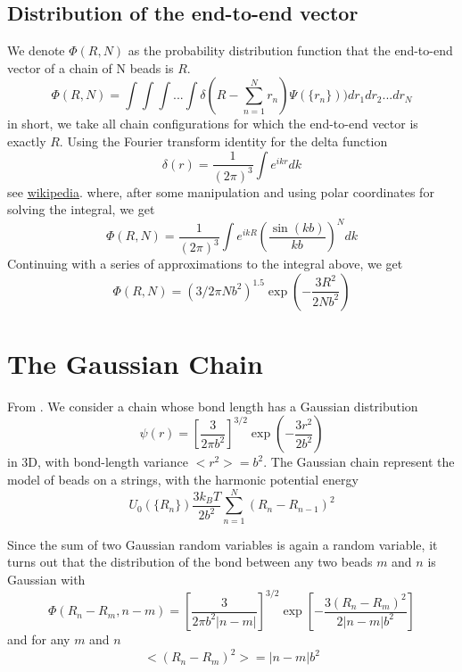 \documentclass{paper}
\begin{document}
\subsection{Distribution of the end-to-end vector}\label{subsection_distributionOfTheEndToEndVector}
We denote $\Phi(R,N)$ as the probability distribution function that the end-to-end vector of a chain of N beads is $R$.
\begin{equation*}
\Phi(R,N) =\int\int\int...\int\delta(R-\sum_{n=1}^Nr_n)\Psi(\{r_n\}))dr_1dr_2...dr_N
\end{equation*}
in short, we take all chain configurations for which the end-to-end vector is exactly $R$. Using the Fourier transform identity for the delta function
\begin{equation*}
\delta(r)= \frac{1}{(2\pi)^3}\int e^{ikr} dk
\end{equation*}
see \href{http://en.wikipedia.org/wiki/Dirac_delta_function}{wikipedia}.
where, after some manipulation and using polar coordinates for solving the integral, we get
\begin{equation*}
\Phi(R,N)=\frac{1}{(2\pi)^3}\int e^{ikR} \left(\frac{\sin(kb)}{kb}\right)^N dk
\end{equation*}
Continuing with a series of approximations to the integral above, we get
\begin{equation*}
\Phi(R,N)=(3/2\pi N b^2)^{1.5} \exp(-\frac{3R^2}{2Nb^2})
\end{equation*}


\section{The Gaussian Chain}\label{section_theGaussianChain}
From \cite{doi1986theory}. We consider a chain whose bond length has a Gaussian distribution 
\begin{equation*}
\psi(r)=\left[\frac{3}{2\pi b^2} \right]^{3/2} \exp \left( -\frac{3r^2}{2b^2} \right)
\end{equation*}
in 3D,  with bond-length variance $<r^2> =b^2$. The Gaussian chain represent the model of beads on a strings, with the harmonic potential energy 
\begin{equation*}
U_0(\{R_n\})\frac{3k_BT}{2b^2}\sum_{n=1}^N (R_n-R_{n-1})^2
\end{equation*}

Since the sum of two Gaussian random variables is again a random variable, it turns out that the distribution of the bond between any two beads $m$ and $n$ is Gaussian with 
\begin{equation*}
\Phi(R_n-R_m,n-m)=\left[\frac{3}{2\pi b^2 |n-m|}\right]^{3/2}\exp \left[-\frac{3(R_n-R_m)^2}{2|n-m|b^2}\right]
\end{equation*}
and for any $m$ and $n$ 
\begin{equation*}
<(R_n-R_m)^2> = |n-m|b^2
\end{equation*}
\end{document}
